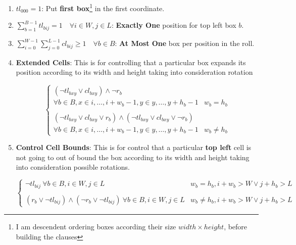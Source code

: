 \documentclass[12pt, a4paper]{article}
\begin{document}
\begin{enumerate}
  \item $tl_{000} = 1$: Put \textbf{first box}\footnote{I am descendent ordering boxes according their size $width \times height$, before building the clauses}  in the first coordinate.\label{prop:1}
  \item $\sum_{b=1}^{B-1} tl_{bij} = 1 \quad \forall i \in W, j \in L$: \textbf{Exactly One} position for top left box $b$. \label{prop:2}
  \item $\sum_{i=0}^{W-1} \sum_{j=0}^{L-1} cl_{bij} \geq 1 \quad \forall b \in B$: \textbf{At Most One} box per position in the roll. \label{prop:3}
  \item \textbf{Extended Cells}: This is for controlling that a particular box expands its position according to its width and height taking into consideration rotation \label{prop:4}

   \begin{equation}
    \begin{cases}
      (\lnot tl_{bxy} \lor cl_{bxy}) \land \lnot r_b \ \\
        \forall b \in B, x \in {i, \dots, i + w_b - 1}, y \in {y, \dots, y + h_b - 1}  & w_b = h_b \\\\
      (\lnot tl_{bxy} \lor cl_{bxy} \lor r_b) \land (\lnot tl_{bxy} \lor cl_{bxy} \lor \lnot r_b) \ \\
        \forall b \in B, x \in {i, \dots, i + w_b - 1}, y \in {y, \dots, y + h_b - 1} & w_b \neq h_b
    \end{cases}
  \end{equation}

\item \textbf{Control Cell Bounds}: This is for control that a particular \textbf{top left} cell is not going to out of bound the box according to its width and height taking into consideration possible rotations.\label{prop:5}

   \begin{equation}
    \begin{cases}
      \lnot tl_{bij} \ \forall b \in B, i \in W, j \in L & w_b = h_b, i+w_b > W \lor j+h_b > L \\\\
      (r_b \lor \lnot tl_{bij}) \land (\lnot r_b \lor \lnot tl_{bij}) \ \forall b \in B, i \in W, j \in L & w_b \neq h_b, i+w_b > W \lor j+h_b > L
    \end{cases}
  \end{equation}

\end{enumerate}
\end{document}
